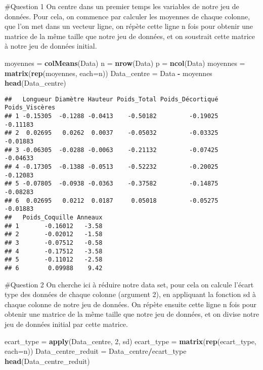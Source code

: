 \documentclass[
]{article}
\newenvironment{Shaded}{\begin{snugshade}}{\end{snugshade}}
\newcommand{\AttributeTok}[1]{\textcolor[rgb]{0.13,0.29,0.53}{#1}}
\newcommand{\DecValTok}[1]{\textcolor[rgb]{0.00,0.00,0.81}{#1}}
\newcommand{\FunctionTok}[1]{\textcolor[rgb]{0.13,0.29,0.53}{\textbf{#1}}}
\newcommand{\NormalTok}[1]{#1}
\newcommand{\OtherTok}[1]{\textcolor[rgb]{0.56,0.35,0.01}{#1}}
\newcommand{\SpecialCharTok}[1]{\textcolor[rgb]{0.81,0.36,0.00}{\textbf{#1}}}
\begin{document}
\#Question 1 On centre dans un premier temps les variables de notre jeu
de données. Pour cela, on commence par calculer les moyennes de chaque
colonne, que l'on met dans un vecteur ligne, on répète cette ligne n
fois pour obtenir une matrice de la même taille que notre jeu de
données, et on soustrait cette matrice à notre jeu de données initial.

\begin{Shaded}
\begin{Highlighting}[]
\NormalTok{moyennes }\OtherTok{=} \FunctionTok{colMeans}\NormalTok{(Data)}
\NormalTok{n }\OtherTok{=} \FunctionTok{nrow}\NormalTok{(Data)}
\NormalTok{p }\OtherTok{=} \FunctionTok{ncol}\NormalTok{(Data)}
\NormalTok{moyennes }\OtherTok{=} \FunctionTok{matrix}\NormalTok{(}\FunctionTok{rep}\NormalTok{(moyennes, }\AttributeTok{each=}\NormalTok{n))}
\NormalTok{Data\_centre }\OtherTok{=}\NormalTok{ Data }\SpecialCharTok{{-}}\NormalTok{ moyennes}
\FunctionTok{head}\NormalTok{(Data\_centre)}
\end{Highlighting}
\end{Shaded}

\begin{verbatim}
##   Longueur Diamètre Hauteur Poids_Total Poids_Décortiqué Poids_Viscères
## 1 -0.15305  -0.1288 -0.0413    -0.50182         -0.19025       -0.11183
## 2  0.02695   0.0262  0.0037    -0.05032         -0.03325       -0.01883
## 3 -0.06305  -0.0288 -0.0063    -0.21132         -0.07425       -0.04633
## 4 -0.17305  -0.1388 -0.0513    -0.52232         -0.20025       -0.12083
## 5 -0.07805  -0.0938 -0.0363    -0.37582         -0.14875       -0.08283
## 6  0.02695   0.0212  0.0187     0.05018         -0.05275       -0.01883
##   Poids_Coquille Anneaux
## 1       -0.16012   -3.58
## 2       -0.02012   -1.58
## 3       -0.07512   -0.58
## 4       -0.17512   -3.58
## 5       -0.11012   -2.58
## 6        0.09988    9.42
\end{verbatim}

\#Question 2 On cherche ici à réduire notre data set, pour cela on
calcule l'écart type des données de chaque colonne (argument 2), en
appliquant la fonction sd à chaque colonne de notre jeu de données. On
répète ensuite cette ligne n fois pour obtenir une matrice de la même
taille que notre jeu de données, et on divise notre jeu de données
initial par cette matrice.

\begin{Shaded}
\begin{Highlighting}[]
\NormalTok{ecart\_type }\OtherTok{=} \FunctionTok{apply}\NormalTok{(Data\_centre, }\DecValTok{2}\NormalTok{, sd)}
\NormalTok{ecart\_type }\OtherTok{=} \FunctionTok{matrix}\NormalTok{(}\FunctionTok{rep}\NormalTok{(ecart\_type, }\AttributeTok{each=}\NormalTok{n))}
\NormalTok{Data\_centre\_reduit }\OtherTok{=}\NormalTok{ Data\_centre}\SpecialCharTok{/}\NormalTok{ecart\_type}
\FunctionTok{head}\NormalTok{(Data\_centre\_reduit)}
\end{Highlighting}
\end{Shaded}
\end{document}
